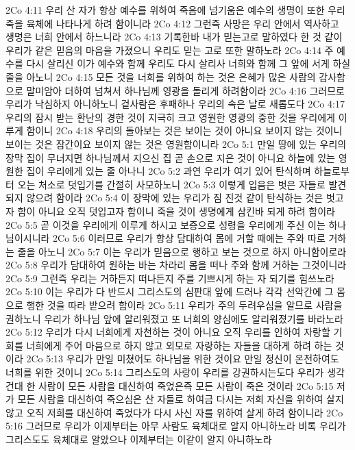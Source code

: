 2Co 4:11  우리 산 자가 항상 예수를 위하여 죽음에 넘기움은 예수의 생명이 또한 우리 죽을 육체에 나타나게 하려 함이니라
2Co 4:12  그런즉 사망은 우리 안에서 역사하고 생명은 너희 안에서 하느니라
2Co 4:13  기록한바 내가 믿는고로 말하였다 한 것 같이 우리가 같은 믿음의 마음을 가졌으니 우리도 믿는 고로 또한 말하노라
2Co 4:14  주 예수를 다시 살리신 이가 예수와 함께 우리도 다시 살리사 너희와 함께 그 앞에 서게 하실 줄을 아노니
2Co 4:15  모든 것을 너희를 위하여 하는 것은 은혜가 많은 사람의 감사함으로 말미암아 더하여 넘쳐서 하나님께 영광을 돌리게 하려함이라
2Co 4:16  그러므로 우리가 낙심하지 아니하노니 겉사람은 후패하나 우리의 속은 날로 새롭도다
2Co 4:17  우리의 잠시 받는 환난의 경한 것이 지극히 크고 영원한 영광의 중한 것을 우리에게 이루게 함이니
2Co 4:18  우리의 돌아보는 것은 보이는 것이 아니요 보이지 않는 것이니 보이는 것은 잠간이요 보이지 않는 것은 영원함이니라
2Co 5:1  만일 땅에 있는 우리의 장막 집이 무너지면 하나님께서 지으신 집 곧 손으로 지은 것이 아니요 하늘에 있는 영원한 집이 우리에게 있는 줄 아나니
2Co 5:2  과연 우리가 여기 있어 탄식하며 하늘로부터 오는 처소로 덧입기를 간절히 사모하노니
2Co 5:3  이렇게 입음은 벗은 자들로 발견되지 않으려 함이라
2Co 5:4  이 장막에 있는 우리가 짐 진것 같이 탄식하는 것은 벗고자 함이 아니요 오직 덧입고자 함이니 죽을 것이 생명에게 삼킨바 되게 하려 함이라
2Co 5:5  곧 이것을 우리에게 이루게 하시고 보증으로 성령을 우리에게 주신 이는 하나님이시니라
2Co 5:6  이러므로 우리가 항상 담대하여 몸에 거할 때에는 주와 따로 거하는 줄을 아노니
2Co 5:7  이는 우리가 믿음으로 행하고 보는 것으로 하지 아니함이로라
2Co 5:8  우리가 담대하여 원하는 바는 차라리 몸을 떠나 주와 함께 거하는 그것이니라
2Co 5:9  그런즉 우리는 거하든지 떠나든지 주를 기쁘시게 하는 자 되기를 힘쓰노라
2Co 5:10  이는 우리가 다 반드시 그리스도의 심판대 앞에 드러나 각각 선악간에 그 몸으로 행한 것을 따라 받으려 함이라
2Co 5:11  우리가 주의 두려우심을 알므로 사람을 권하노니 우리가 하나님 앞에 알리워졌고 또 너희의 양심에도 알리워졌기를 바라노라
2Co 5:12  우리가 다시 너희에게 자천하는 것이 아니요 오직 우리를 인하여 자랑할 기회를 너희에게 주어 마음으로 하지 않고 외모로 자랑하는 자들을 대하게 하려 하는 것이라
2Co 5:13  우리가 만일 미쳤어도 하나님을 위한 것이요 만일 정신이 온전하여도 너희를 위한 것이니
2Co 5:14  그리스도의 사랑이 우리를 강권하시는도다 우리가 생각건대 한 사람이 모든 사람을 대신하여 죽었은즉 모든 사람이 죽은 것이라
2Co 5:15  저가 모든 사람을 대신하여 죽으심은 산 자들로 하여금 다시는 저희 자신을 위하여 살지 않고 오직 저희를 대신하여 죽었다가 다시 사신 자를 위하여 살게 하려 함이니라
2Co 5:16  그러므로 우리가 이제부터는 아무 사람도 육체대로 알지 아니하노라 비록 우리가 그리스도도 육체대로 알았으나 이제부터는 이같이 알지 아니하노라
